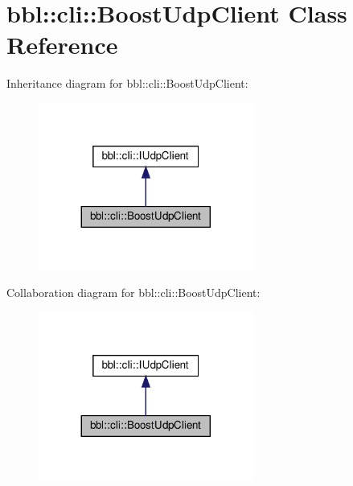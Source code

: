 \hypertarget{classbbl_1_1cli_1_1_boost_udp_client}{}\section{bbl\+:\+:cli\+:\+:Boost\+Udp\+Client Class Reference}
\label{classbbl_1_1cli_1_1_boost_udp_client}


Inheritance diagram for bbl\+:\+:cli\+:\+:Boost\+Udp\+Client\+:
\nopagebreak
\begin{figure}[H]
\begin{center}
\leavevmode
\includegraphics[width=200pt]{classbbl_1_1cli_1_1_boost_udp_client__inherit__graph}
\end{center}
\end{figure}


Collaboration diagram for bbl\+:\+:cli\+:\+:Boost\+Udp\+Client\+:
\nopagebreak
\begin{figure}[H]
\begin{center}
\leavevmode
\includegraphics[width=200pt]{classbbl_1_1cli_1_1_boost_udp_client__coll__graph}
\end{center}
\end{figure}
